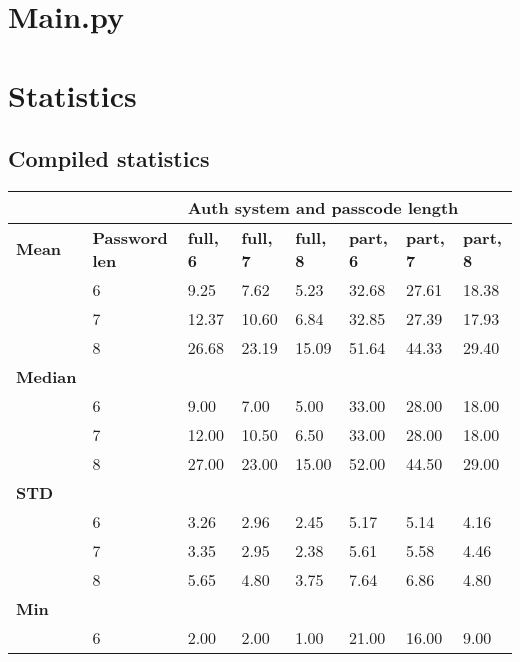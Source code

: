 \documentclass[british,10pt,a4paper]{article}
\begin{document}
\clearpage


\clearpage
\begin{appendices}

	\section{Main.py}\label{app:main}
		
	\clearpage

	\section{Statistics}\label{app:extra_stats}
	\subsection{Compiled statistics}
	\begin{table}[h]
		\centering
		\begin{tabular}{|l|l|l|l|l|l|l|l|}
		\hline
		& & \multicolumn{6}{l|}{\textbf{Auth system and passcode length}} \\ \hline
		\textbf{Mean} & \textbf{Password len} & \textbf{full, 6} & \textbf{full, 7} & \textbf{full, 8} & \textbf{part, 6} & \textbf{part, 7} & \textbf{part, 8} \\ \hline
		 & 6 & 9.25 & 7.62 & 5.23 & 32.68 & 27.61 & 18.38 \\ \hline
		 & 7 & 12.37 & 10.60 & 6.84 & 32.85 & 27.39 & 17.93 \\ \hline
		 & 8 & 26.68 & 23.19 & 15.09 & 51.64 & 44.33 & 29.40 \\ \hline
		\textbf{Median} &  &  &  &  &  &  &  \\ \hline
		 & 6 & 9.00 & 7.00 & 5.00 & 33.00 & 28.00 & 18.00 \\ \hline
		 & 7 & 12.00 & 10.50 & 6.50 & 33.00 & 28.00 & 18.00 \\ \hline
		 & 8 & 27.00 & 23.00 & 15.00 & 52.00 & 44.50 & 29.00 \\ \hline
		\textbf{STD} &  &  &  &  &  &  &  \\ \hline
		 & 6 & 3.26 & 2.96 & 2.45 & 5.17 & 5.14 & 4.16 \\ \hline
		 & 7 & 3.35 & 2.95 & 2.38 & 5.61 & 5.58 & 4.46 \\ \hline
		 & 8 & 5.65 & 4.80 & 3.75 & 7.64 & 6.86 & 4.80 \\ \hline
		\textbf{Min} &  &  &  &  &  &  &  \\ \hline
		 & 6 & 2.00 & 2.00 & 1.00 & 21.00 & 16.00 & 9.00 \\ \hline

\end{tabular}
\end{table}
\end{appendices}
\end{document}
